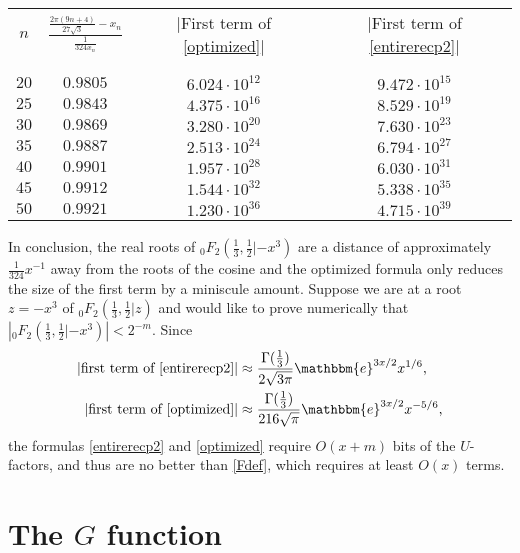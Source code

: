 \documentclass[12pt]{article}
\newcommand{\ee}[0] {\mathbbm{e}}
\numberwithin{equation}{section}
\newcommand{\FFf}[5] {{}_{#1}{#2}_{#3} \left(#4 | {#5} \right)}
\begin{document}
\begin{center}
\begin{tabular}{c|ccc}
$n$ & $\frac{\frac{2\pi(9n+4)}{27 \sqrt{3}} - x_n}{\frac{1}{324 x_n}}$ & $|$First term of \eqref{optimized}$|$ & $|$First term of \eqref{entirerecp2}$|$ \\[-2.0ex] \\ \hline \\ [-2ex]
 $20$ & $0.9805$ & $6.024\cdot10^{12}$ & $9.472\cdot10^{15}$ \\
 $25$ & $0.9843$ & $4.375\cdot10^{16}$ & $8.529\cdot10^{19}$ \\
 $30$ & $0.9869$ & $3.280\cdot10^{20}$ & $7.630\cdot10^{23}$ \\
 $35$ & $0.9887$ & $2.513\cdot10^{24}$ & $6.794\cdot10^{27}$ \\
 $40$ & $0.9901$ & $1.957\cdot10^{28}$ & $6.030\cdot10^{31}$ \\
 $45$ & $0.9912$ & $1.544\cdot10^{32}$ & $5.338\cdot10^{35}$ \\
 $50$ & $0.9921$ & $1.230\cdot10^{36}$ & $4.715\cdot10^{39}$
\end{tabular}
\end{center}
In conclusion, the real roots of $\FFf{0}{F}{2}{\tfrac{1}{3},\tfrac{1}{2}}{-x^3}$ are a distance of approximately $\tfrac{1}{324} x^{-1}$ away from the roots of the cosine and the optimized formula only reduces the size of the first term by a miniscule amount. Suppose we are at a root $z=-x^3$ of $\FFf{0}{F}{2}{\tfrac{1}{3},\tfrac{1}{2}}{z}$ and would like to prove numerically that $|\FFf{0}{F}{2}{\tfrac{1}{3},\tfrac{1}{2}}{-x^3}|<2^{-m}$. Since
\begin{align*}
|\text{first term of \eqref{entirerecp2}}| &\approx \frac{\Gamma(\tfrac13)}{2 \sqrt{3 \pi}} \ee^{3x/2} x^{1/6}\text{,}\\
|\text{first term of \eqref{optimized}}| &\approx \frac{\Gamma(\tfrac13)}{216 \sqrt{\pi}} \ee^{3x/2} x^{-5/6}\text{,}
\end{align*}
the formulas \eqref{entirerecp2} and \eqref{optimized} require $O(x+m)$ bits of the $U$-factors, and thus are no better than \eqref{Fdef}, which requires at least $O(x)$ terms.

\section{The $G$ function}

\newcommand{\bfalpha}[0] {\pmb{\alpha}}
\newcommand{\bfgamma}[0] {\pmb{\gamma}}
\newcommand{\bfbeta}[0]  {\pmb{\beta}}
\newcommand{\bfdelta}[0] {\pmb{\delta}}
\end{document}
